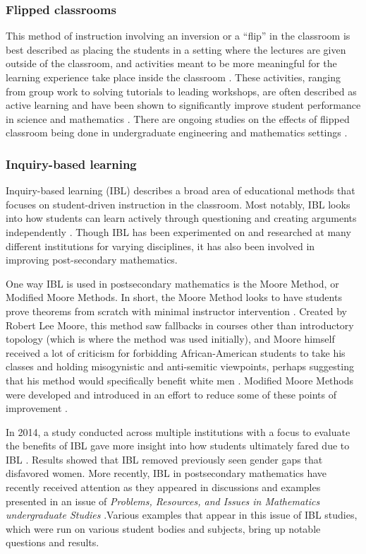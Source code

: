 \subsubsection{Flipped classrooms}
This method of instruction involving an inversion or a ``flip'' in the classroom is best described as placing the students in a setting where the lectures are given outside of the classroom, and activities meant to be more meaningful for the learning experience take place inside the classroom \citep{zappe_flipping_2009}. These activities, ranging from group work to solving tutorials to leading workshops, are often described as active learning and have been shown to significantly improve student performance in science and mathematics \citep{freeman_active_2014}. There are ongoing studies on the effects of flipped classroom being done in undergraduate engineering and mathematics settings \citep{yong_why_2015}.

\subsubsection{Inquiry-based learning}
Inquiry-based learning (IBL) describes a broad area of educational methods that focuses on student-driven instruction in the classroom. Most notably, IBL looks into how students can learn actively through questioning and creating arguments independently \citep{yoshinobu_overview_2013}. Though IBL has been experimented on and researched at many different institutions for varying disciplines, it has also been involved in improving post-secondary mathematics.

One way IBL is used in postsecondary mathematics is the Moore Method, or Modified Moore Methods. In short, the Moore Method looks to have students prove theorems from scratch with minimal instructor intervention \citep{ab_getting_1992}. Created by Robert Lee Moore, this method saw fallbacks in courses other than introductory topology (which is where the method was used initially), and Moore himself received a lot of criticism for forbidding African-American students to take his classes and holding misogynistic and anti-semitic viewpoints, perhaps suggesting that his method would specifically benefit white men \citep{ross_r._2007}. Modified Moore Methods were developed and introduced in an effort to reduce some of these points of improvement \citep{cohen_modified_1982}.

In 2014, a study conducted across multiple institutions with a focus to evaluate the benefits of IBL gave more insight into how students ultimately fared due to IBL \citep{laursen_benefits_2014}. Results showed that IBL removed previously seen gender gaps that disfavored women. More recently, IBL in postsecondary mathematics have recently received attention as they appeared in discussions and examples presented in an issue of {\it Problems, Resources, and Issues in Mathematics undergraduate Studies} \citep{katz_introduction_2017}.Various examples that appear in this issue of IBL studies, which were run on various student bodies and subjects, bring up notable questions and results.

